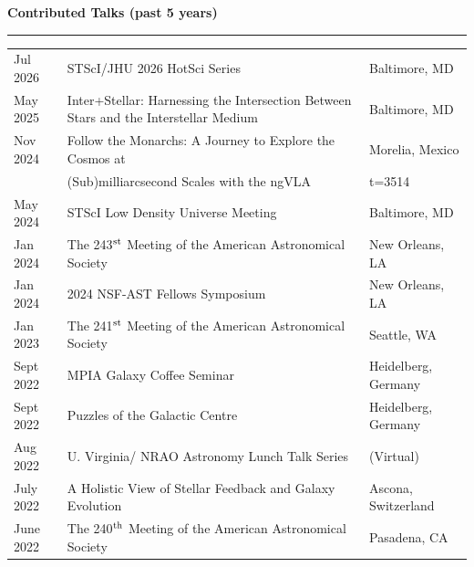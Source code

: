 \documentclass[11pt]{article}
\makeatletter
\def\vhrulefill#1{\leavevmode\leaders\hrule \@height #1\hfill \kern\z@}
\newcommand{\subsectionname}[1]{{\large\bf #1 \vhrulefill{0.5pt}}}
\makeatother
\begin{document}

\subsectionname{Contributed Talks {\small (past 5 years)}}\vspace{-6pt}


\begin{longtable}{p{} p{}p{}}

Jul 2026 & STScI/JHU 2026 HotSci Series & {\small Baltimore, MD}\\

May 2025 & Inter+Stellar: Harnessing the Intersection Between Stars and the Interstellar Medium & {\small Baltimore, MD}\\

Nov 2024 & Follow the Monarchs: A Journey to Explore the Cosmos at  & {\small Morelia, Mexico}\\
& (Sub)milliarcsecond Scales with the ngVLA {\small(\href{https://youtu.be/CHdCz9VyqIM?si=kyrCyJ9LXm9UtWOj&t=3514}{Recorded})} & \\

May 2024 & STScI Low Density Universe Meeting & {\small Baltimore, MD}\\

Jan 2024 & The 243$^{\rm st}$ Meeting of the American Astronomical Society & {\small New Orleans, LA}\\

Jan 2024 & 2024 NSF-AST Fellows Symposium & {\small New Orleans, LA}\\

Jan 2023 & The 241$^{\rm st}$ Meeting of the American Astronomical Society & {\small Seattle, WA}\\


Sept 2022 & MPIA Galaxy Coffee Seminar & {\small Heidelberg, Germany}\\

Sept 2022 & Puzzles of the Galactic Centre & {\small Heidelberg, Germany}\\

Aug 2022 & U. Virginia/ NRAO Astronomy Lunch Talk Series & {\small (Virtual)}\\

July 2022 & A Holistic View of Stellar Feedback and Galaxy Evolution & {\small Ascona, Switzerland}\\

June  2022 &The 240$^{\rm th}$ Meeting of the American Astronomical Society & {\small Pasadena, CA}\\


\end{longtable}
\end{document}
